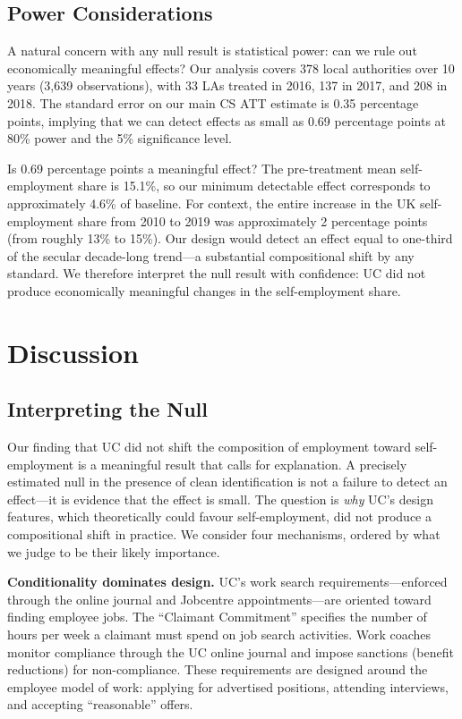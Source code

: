 \documentclass[12pt]{article}
\begin{document}


\subsection{Power Considerations}

A natural concern with any null result is statistical power: can we rule out economically meaningful effects? Our analysis covers 378 local authorities over 10 years (3,639 observations), with 33 LAs treated in 2016, 137 in 2017, and 208 in 2018. The standard error on our main CS ATT estimate is 0.35 percentage points, implying that we can detect effects as small as 0.69 percentage points at 80\% power and the 5\% significance level.

Is 0.69 percentage points a meaningful effect? The pre-treatment mean self-employment share is 15.1\%, so our minimum detectable effect corresponds to approximately 4.6\% of baseline. For context, the entire increase in the UK self-employment share from 2010 to 2019 was approximately 2 percentage points (from roughly 13\% to 15\%). Our design would detect an effect equal to one-third of the secular decade-long trend---a substantial compositional shift by any standard. We therefore interpret the null result with confidence: UC did not produce economically meaningful changes in the self-employment share.


\section{Discussion}

\subsection{Interpreting the Null}

Our finding that UC did not shift the composition of employment toward self-employment is a meaningful result that calls for explanation. A precisely estimated null in the presence of clean identification is not a failure to detect an effect---it is evidence that the effect is small. The question is \textit{why} UC's design features, which theoretically could favour self-employment, did not produce a compositional shift in practice. We consider four mechanisms, ordered by what we judge to be their likely importance.

\textbf{Conditionality dominates design.} UC's work search requirements---enforced through the online journal and Jobcentre appointments---are oriented toward finding employee jobs. The ``Claimant Commitment'' specifies the number of hours per week a claimant must spend on job search activities. Work coaches monitor compliance through the UC online journal and impose sanctions (benefit reductions) for non-compliance. These requirements are designed around the employee model of work: applying for advertised positions, attending interviews, and accepting ``reasonable'' offers.
\end{document}
